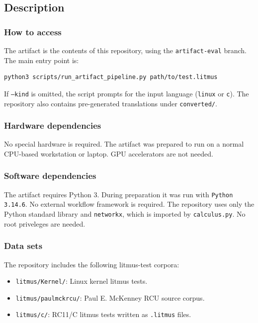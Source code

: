 \documentclass{sigplanconf}
\begin{document}
\subsection{Description}

\subsubsection{How to access}

The artifact is the contents of this repository, using the
\texttt{artifact-eval} branch.  The main entry point is:

\begin{verbatim}
python3 scripts/run_artifact_pipeline.py path/to/test.litmus
\end{verbatim}

If \texttt{--kind} is omitted, the script prompts for the input language
(\texttt{linux} or \texttt{c}).  The repository also contains pre-generated
translations under \texttt{converted/}.

\subsubsection{Hardware dependencies}

No special hardware is required.  The artifact was prepared to run on a normal
CPU-based workstation or laptop.  GPU accelerators are not needed.

\subsubsection{Software dependencies}

The artifact requires Python 3.  During preparation it was run with
\texttt{Python 3.14.6}.  No external workflow framework is required.
The repository uses only the Python standard library and \texttt{networkx},
which is imported by \texttt{calculus.py}. No root priveleges are needed.

\subsubsection{Data sets}

The repository includes the following litmus-test corpora:

\begin{itemize}
  \item \texttt{litmus/Kernel/}: Linux kernel litmus tests.
  \item \texttt{litmus/paulmckrcu/}: Paul E. McKenney RCU source corpus.
  \item \texttt{litmus/c/}: RC11/C litmus tests written as \texttt{.litmus} files.
\end{itemize}
\end{document}
